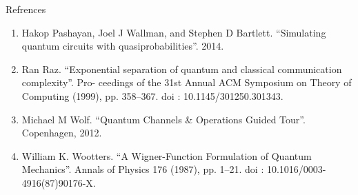 \documentclass{beamer}
\begin{document}
\begin{frame}{Refrences}
\begin{enumerate}
\item Hakop Pashayan, Joel J Wallman, and Stephen D Bartlett. “Simulating quantum circuits with
quasiprobabilities”. 2014.
\item Ran Raz. “Exponential separation of quantum and classical communication complexity”. Pro-
ceedings of the 31st Annual ACM Symposium on Theory of Computing (1999), pp. 358–367.
doi : 10.1145/301250.301343.
\item Michael M Wolf. “Quantum Channels \& Operations Guided Tour”. Copenhagen, 2012.
\item William K. Wootters. “A Wigner-Function Formulation of Quantum Mechanics”. Annals of
Physics 176 (1987), pp. 1–21. doi : 10.1016/0003-4916(87)90176-X.
\end{enumerate}
\end{frame}
\end{document}
